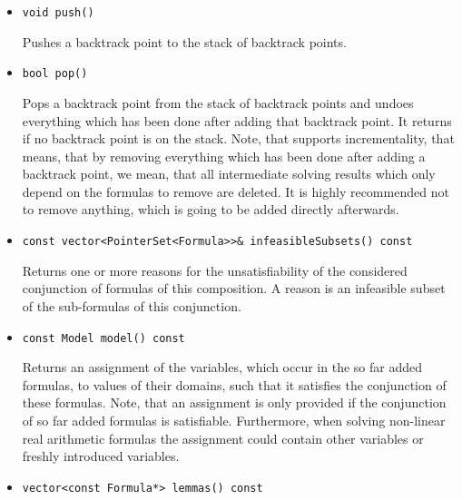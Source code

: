 \begin{itemize}
	used. The strategy of an SMT solver composed with \smtrat has to involve a \satModuleClass before any theory module
	is used\footnote{It is possible to define a strategy using conditions in a way, that we achieve an SMT solver, even if for some cases no \satModuleClass is involved before a theory module is applied.} and, therefore, the SMT solver never communicates these lemmas as they are already processed by the
	\satModuleClass. A better explanation on the modules and the strategy are given in Section~\ref{sec:managerstrategy} 
	of the last chapter and Chapter~\ref{chapter:composingats}.
     \item \begin{verbatim}void push()\end{verbatim}
    	Pushes a backtrack point to the stack of backtrack points.
    \item \begin{verbatim}bool pop()\end{verbatim}
    	Pops a backtrack point from the stack of backtrack points and undoes everything
		which has been done after adding that backtrack point. It returns \false if no backtrack
		point is on the stack. Note, that \smtrat supports incrementality, that means, that by removing
		everything which has been done after adding a backtrack point, we mean, that all 
		intermediate solving results which only depend on the formulas to remove are deleted. It is highly
		recommended not to remove anything, which is going to be added directly afterwards.
    \item \begin{verbatim}const vector<PointerSet<Formula>>& infeasibleSubsets() const\end{verbatim}
    	Returns one or more reasons for the unsatisfiability of the considered conjunction of 
    	formulas of this \smtrat composition. A reason
    	is an infeasible subset of the sub-formulas of this conjunction.
    \item \begin{verbatim}const Model model() const\end{verbatim}
    	Returns an assignment of the variables, which occur in the so far added
        formulas, to values of their domains, such that it satisfies the 
        conjunction of these formulas. Note, that an assignment is only provided if the conjunction of so far added
        formulas is satisfiable. Furthermore, when solving non-linear real arithmetic 
        formulas the assignment could contain other variables or freshly introduced
        variables.
    \item \begin{verbatim}vector<const Formula*> lemmas() const\end{verbatim}
\end{itemize}

